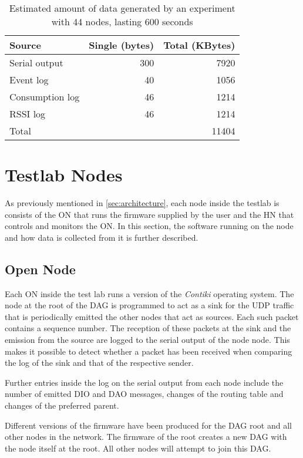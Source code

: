 \begin{table}
  \centering
  \caption{Estimated amount of data generated by an experiment with 44 nodes,
    lasting 600 seconds}
  \begin{tabular}{lrr}
    \toprule
    Source & Single (bytes) & Total (KBytes)\\
    \midrule
    Serial output & 300 & 7920 \\
    Event log & 40 & 1056 \\
    Consumption log & 46 & 1214 \\
    RSSI log & 46 & 1214 \\
    \midrule
    Total & & 11404 \\
  \end{tabular}
  \label{tab:amountdata}
\end{table}

\section{Testlab Nodes}

As previously mentioned in \autoref{sec:architecture}, each node inside the
testlab is consists of the \ac{ON} that runs the firmware supplied by the user
and the \ac{HN} that controls and monitors the \ac{ON}. In this section, the
software running on the node and how data is collected from it is further
described.

\subsection{Open Node}

Each \ac{ON} inside the test lab runs a version of the \emph{Contiki} operating
system. The node at the root of the \ac{DAG} is programmed to act as a sink for
the \ac{UDP} traffic that is periodically emitted the other nodes that act as
sources. Each such packet contains a sequence number. The reception of these
packets at the sink and the emission from the source are logged to the serial
output of the node node. This makes it possible to detect whether a packet has
been received when comparing the log of the sink and that of the respective
sender.

Further entries inside the log on the serial output from each node include the
number of emitted \ac{DIO} and \ac{DAO} messages, changes of the routing table and changes
of the preferred parent.

Different versions of the firmware have been produced for the \ac{DAG} root and
all other nodes in the network. The firmware of the root creates a new
\ac{DAG} with the node itself at the root. All other nodes will attempt to join
this \ac{DAG}.

